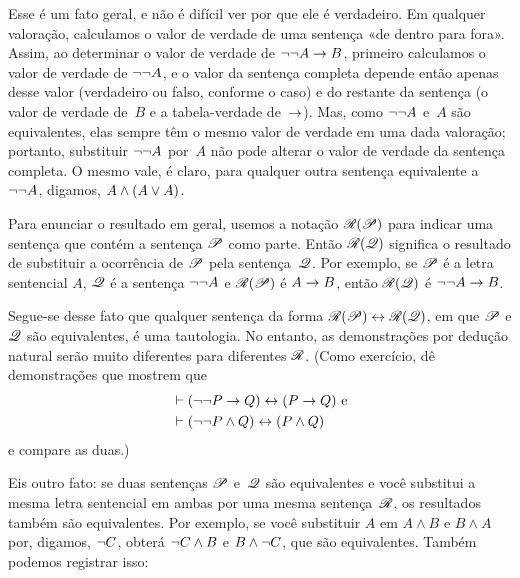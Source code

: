 Esse é um fato geral, e não é difícil ver por que ele é verdadeiro. Em qualquer valoração, calculamos o valor de verdade de uma sentença «de dentro para fora». Assim, ao determinar o valor de verdade de $\neg\neg A \rightarrow B$, primeiro calculamos o valor de verdade de $\neg\neg A$, e o valor da sentença completa depende então apenas desse valor (verdadeiro ou falso, conforme o caso) e do restante da sentença (o valor de verdade de~$B$ e a tabela-verdade de~$\rightarrow$). Mas, como $\neg\neg A$ e~$A$ são equivalentes, elas sempre têm o mesmo valor de verdade em uma dada valoração; portanto, substituir $\neg\neg A$ por~$A$ não pode alterar o valor de verdade da sentença completa. O mesmo vale, é claro, para qualquer outra sentença equivalente a $\neg\neg A$, digamos, $A \wedge (A \vee A)$.












Para enunciar o resultado em geral, usemos a notação $\mathscr{R}(\mathscr{P})$ para indicar uma sentença que contém a sentença $\mathscr{P}$ como parte. Então $\mathscr{R}(\mathscr{Q})$ significa o resultado de substituir a ocorrência de $\mathscr{P}$ pela sentença~$\mathscr{Q}$. Por exemplo, se $\mathscr{P}$ é a letra sentencial $A$, $\mathscr{Q}$ é a sentença $\neg\neg A$ e $\mathscr{R}(\mathscr{P})$ é $A \rightarrow B$, então $\mathscr{R}(\mathscr{Q})$ é $\neg\neg A \rightarrow B$.


Segue-se desse fato que qualquer sentença da forma $\mathscr{R}(\mathscr{P}) \leftrightarrow \mathscr{R}(\mathscr{Q})$, em que $\mathscr{P}$ e $\mathscr{Q}$ são equivalentes, é uma tautologia. No entanto, as demonstrações por dedução natural serão muito diferentes para diferentes $\mathscr{R}$. (Como exercício, dê demonstrações que mostrem que
\begin{align*}
	& \vdash (\neg\neg P \rightarrow Q) \leftrightarrow (P \rightarrow Q)  \text{ e}\\
	& \vdash (\neg\neg P \wedge Q) \leftrightarrow (P \wedge Q)
\end{align*}
e compare as duas.)

Eis outro fato: se duas sentenças $\mathscr{P}$ e~$\mathscr{Q}$ são equivalentes e você substitui a mesma letra sentencial em ambas por uma mesma sentença~$\mathscr{R}$, os resultados também são equivalentes. Por exemplo, se você substituir $A$ em $A \land B$ e $B \land A$ por, digamos, $\neg C$, obterá $\neg C \land B$ e $B \land \neg C$, que são equivalentes. Também podemos registrar isso:

